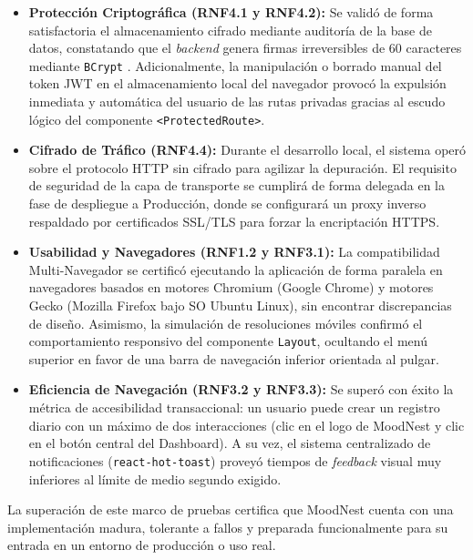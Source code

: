 \begin{itemize}
    \item \textbf{Protección Criptográfica (RNF4.1 y RNF4.2):} Se validó de forma satisfactoria el almacenamiento cifrado mediante auditoría de la base de datos, constatando que el \textit{backend} genera firmas irreversibles de 60 caracteres mediante \texttt{BCrypt} \cite{bib:bcrypt}. Adicionalmente, la manipulación o borrado manual del token JWT en el almacenamiento local del navegador provocó la expulsión inmediata y automática del usuario de las rutas privadas gracias al escudo lógico del componente \texttt{<ProtectedRoute>}.
    \item \textbf{Cifrado de Tráfico (RNF4.4):} Durante el desarrollo local, el sistema operó sobre el protocolo HTTP sin cifrado para agilizar la depuración. El requisito de seguridad de la capa de transporte se cumplirá de forma delegada en la fase de despliegue a Producción, donde se configurará un proxy inverso respaldado por certificados SSL/TLS para forzar la encriptación HTTPS.
    \item \textbf{Usabilidad y Navegadores (RNF1.2 y RNF3.1):} La compatibilidad Multi-Navegador se certificó ejecutando la aplicación de forma paralela en navegadores basados en motores Chromium (Google Chrome) y motores Gecko (Mozilla Firefox bajo SO Ubuntu Linux), sin encontrar discrepancias de diseño. Asimismo, la simulación de resoluciones móviles confirmó el comportamiento responsivo del componente \texttt{Layout}, ocultando el menú superior en favor de una barra de navegación inferior orientada al pulgar.
    \item \textbf{Eficiencia de Navegación (RNF3.2 y RNF3.3):} Se superó con éxito la métrica de accesibilidad transaccional: un usuario puede crear un registro diario con un máximo de dos interacciones (clic en el logo de MoodNest y clic en el botón central del Dashboard). A su vez, el sistema centralizado de notificaciones (\texttt{react-hot-toast}) \cite{bib:react_hot_toast} proveyó tiempos de \textit{feedback} visual muy inferiores al límite de medio segundo exigido.
\end{itemize}

La superación de este marco de pruebas certifica que MoodNest cuenta con una implementación madura, tolerante a fallos y preparada funcionalmente para su entrada en un entorno de producción o uso real.